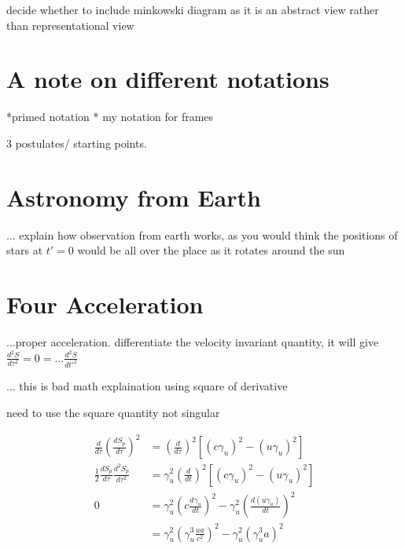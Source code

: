 decide whether to include minkowski diagram as it is an abstract view rather than representational view

\section{A note on different notations}
*primed notation
* my notation for frames

3 postulates/ starting points.

\section{Astronomy from Earth}

... explain how observation from earth works, as you would think the positions of stars at $t'=0$ would be all over the place as it rotates around the sun

\section{Four Acceleration}

...proper acceleration. differentiate the velocity invariant quantity, it will give \( \frac{d^2 S}{d\tau^2} = 0 = ...\frac{d^2 S}{dt{'}^2} \)

... this is bad math explaination using square of derivative

need to use the square quantity not singular

\begin{equation}
	\begin{aligned}
		\frac{d}{d\tau} \left(\frac{dS_p}{d\tau}\right)^2 & = \left(\frac{d}{d\tau}\right)^2 \left[ \left(c\gamma_{u}\right)^2-\left(u\gamma_{u} \right)^2 \right]                           \\
		\frac{1}{2} \frac{dS_p}{d\tau} \frac{d^2S_p}{d\tau^2}                               & = \gamma_u^2\left(\frac{d}{dt}\right)^2 \left[ \left(c\gamma_{u}\right)^2-\left(u\gamma_{u} \right)^2 \right]                           \\
		                                                              0   & = \gamma_u^2\left(c\frac{d \gamma_{u}}{dt}\right)^2-\gamma_u^2\left(\frac{d\left(u\gamma_{u} \right)}{dt}\right)^2 \\
																	  & = \gamma_u^2 \left( \gamma_u^3 \frac{u a}{{c}^2} \right)^2-\gamma_u^2\left( \gamma_u^3 a \right)^2
	\end{aligned}
\end{equation}

